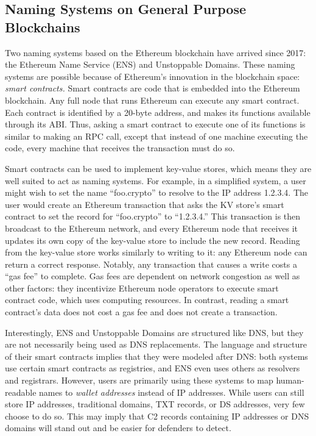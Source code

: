 \subsection{Naming Systems on General Purpose Blockchains}

Two naming systems based on the Ethereum blockchain have 
arrived since 2017: the Ethereum Name 
Service (ENS) and Unstoppable Domains. These naming systems 
are possible because of Ethereum's innovation in the 
blockchain space: \emph{smart contracts.} Smart contracts 
are code that is embedded into the Ethereum 
blockchain. Any full node that runs Ethereum can execute any 
smart contract. Each contract is identified by a 20-byte 
address, and makes its functions available through its ABI. 
Thus, asking a smart contract to execute one of its functions is similar to 
making an RPC call, except that instead of one machine executing the code, 
every machine that receives the transaction must do so. 

Smart contracts can be used to implement key-value stores, which means they are 
well suited to act as naming 
systems. For example, in a simplified system, a user might wish to set the name 
``foo.crypto'' to resolve to the IP address 1.2.3.4. The user would create an 
Ethereum transaction that asks the KV store's smart contract 
to set the record for ``foo.crypto'' to ``1.2.3.4.'' 
This transaction is then broadcast to the Ethereum network, 
and every Ethereum 
node that receives it updates its own copy of the key-value store to include 
the new record. Reading from the key-value store works similarly to writing to 
it: any Ethereum node can return a correct response. 
Notably, any transaction that causes a write costs a ``gas 
fee'' to complete. Gas fees are dependent on network 
congestion as well as other factors: they incentivize 
Ethereum node operators to execute smart contract code, which 
uses computing resources. In contrast, reading a 
smart contract's data does not cost a gas fee and does not 
create a transaction.

Interestingly, ENS and Unstoppable Domains are structured 
like DNS, but they are not necessarily being used as DNS 
replacements. The language and structure of their smart 
contracts implies that they were 
modeled after DNS: both systems use certain smart contracts 
as registries, and ENS even uses others as resolvers and 
registrars. However, users are primarily using these systems 
to map human-readable names to \emph{wallet addresses} 
instead of IP addresses. While users can still store IP 
addresses, traditional domains, TXT records, or DS addresses, 
very few choose to do so. This may imply that C2 records containing IP 
addresses or DNS domains will stand out and be easier for defenders to detect.

